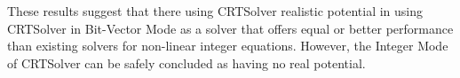These results suggest that there using CRTSolver realistic potential in using CRTSolver in Bit-Vector Mode
as a solver that offers equal or better performance than existing solvers for non-linear
integer equations. However, the Integer Mode of CRTSolver can be safely concluded as having no real potential.
